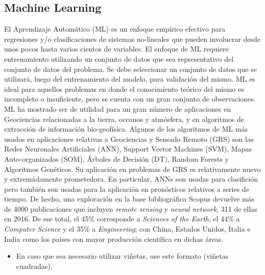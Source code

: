 \subsection{Machine Learning}
El Aprendizaje Automático (ML) es un enfoque empírico efectivo para
regresiones y/o clasificaciones de sistemas no-lineales que pueden involucrar desde
unos pocos hasta varios cientos de variables. El enfoque de ML requiere
entrenamiento utilizando un conjunto de datos que sea representativo del conjunto
de datos del problema. Se debe seleccionar un conjunto de datos que se utilizará,
luego del entrenamiento del modelo, para validación del mismo.
ML es ideal para aquellos problemas en donde el conocimiento teórico del mismo
es incompleto o insuficiente, pero se cuenta con un gran conjunto de observaciones.
ML ha mostrado ser de utilidad para un gran número de aplicaciones en Geociencias
relacionadas a la tierra, oceanos y atmósfera, y en algoritmos de extracción
de información bio-geofísica.
Algunos de los algoritmos de ML más usados en aplicaciones relativas a
Geociencias y Sensado Remoto (GRS) son las Redes Neuronales Artificiales (ANN),
Support Vector Machines (SVM), Mapas Auto-organizados (SOM), Árboles de Decisión (DT),
Random Forests y Algoritmos Genéticos. Su aplicación en problemas de GRS es
relativamente nuevo y extremádamente prometedora. En particular, ANNs son
usadas para clasifición pero también son usadas para la aplicación en pronósticos
relativos a series de tiempo.
De hecho, una exploración en la base bibliográfica Scopus devuelve más de 4000
publicaciones que incluyen \textit{remote sensing} y \textit{neural network},
311 de ellas en 2016. De ese total, el 45\% corresponde a
\textit{Sciences of the Earth}, el 44\% a \textit{Computer Science} y el 35\% a
\textit{Engineering}; con China, Estados Unidos, Italia e India como los paises
con mayor producción científica en dichas áreas.


\begin{itemize}
\item En caso que sea necesario utilizar vi\~{n}etas, use este formato (vi\~{n}etas cuadradas).
\end{itemize}
